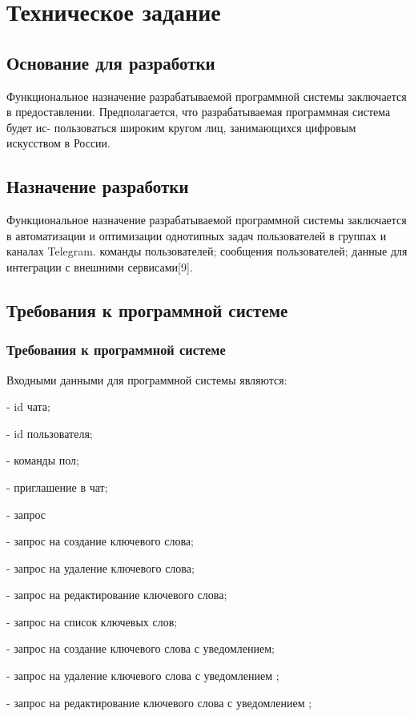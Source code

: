 \newsection
\section{Техническое задание}
\subsection{Основание для разработки}

Функциональное назначение разрабатываемой программной системы заключается в предоставлении.
Предполагается, что разрабатываемая программная система будет ис- пользоваться широким кругом лиц, занимающихся цифровым искусством в России.

\subsection{Назначение разработки}

Функциональное назначение разрабатываемой программной системы заключается в автоматизации и оптимизации однотипных задач пользователей в группах и каналах Telegram. команды пользователей; сообщения пользователей; данные для интеграции с внешними сервисами[9].
\subsection{Требования к программной системе}
\subsubsection{Требования к программной системе}

Входными данными для программной системы являются:

-	id чата;

-	id пользователя;

-	команды пол;

-	приглашение в чат;

-	запрос 

-	запрос на создание ключевого слова;

-	запрос на удаление ключевого слова;

-	запрос на редактирование ключевого слова;

-	запрос на список ключевых слов;

-	запрос на создание ключевого слова с уведомлением;

-	запрос на удаление ключевого слова с уведомлением ;

-	запрос на редактирование ключевого слова с уведомлением ;

